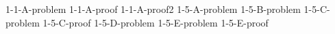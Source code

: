 \documentclass[uplatex, dvipdfmx, a4paper, 12pt, class=jsarticle, crop=false]{standalone}
\begin{document}
	{1-1-A-problem}
	{1-1-A-proof}
	{1-1-A-proof2}
	{1-5-A-problem}
	{1-5-B-problem}
	{1-5-C-problem}
	{1-5-C-proof}
	{1-5-D-problem}
	{1-5-E-problem}
	{1-5-E-proof}
\end{document}
